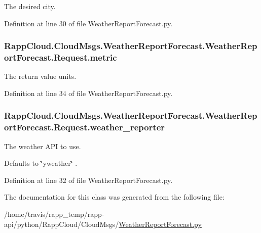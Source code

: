 The desired city. 



Definition at line 30 of file Weather\-Report\-Forecast.\-py.

\hypertarget{classRappCloud_1_1CloudMsgs_1_1WeatherReportForecast_1_1WeatherReportForecast_1_1Request_a2d4f2b9136975273b833f7306203cea7}{
\subsubsection[{metric}]{\setlength{\rightskip}{0pt plus 5cm}Rapp\-Cloud.\-Cloud\-Msgs.\-Weather\-Report\-Forecast.\-Weather\-Report\-Forecast.\-Request.\-metric}}\label{classRappCloud_1_1CloudMsgs_1_1WeatherReportForecast_1_1WeatherReportForecast_1_1Request_a2d4f2b9136975273b833f7306203cea7}


The return value units. 



Definition at line 34 of file Weather\-Report\-Forecast.\-py.

\hypertarget{classRappCloud_1_1CloudMsgs_1_1WeatherReportForecast_1_1WeatherReportForecast_1_1Request_a2101fc3bd266a689b7e7430fb349afc9}{
\subsubsection[{weather\-\_\-reporter}]{\setlength{\rightskip}{0pt plus 5cm}Rapp\-Cloud.\-Cloud\-Msgs.\-Weather\-Report\-Forecast.\-Weather\-Report\-Forecast.\-Request.\-weather\-\_\-reporter}}\label{classRappCloud_1_1CloudMsgs_1_1WeatherReportForecast_1_1WeatherReportForecast_1_1Request_a2101fc3bd266a689b7e7430fb349afc9}


The weather A\-P\-I to use. 

Defaults to \char`\"{}yweather\char`\"{} . 

Definition at line 32 of file Weather\-Report\-Forecast.\-py.



The documentation for this class was generated from the following file\-:\begin{DoxyCompactItemize}
\item 
/home/travis/rapp\-\_\-temp/rapp-\/api/python/\-Rapp\-Cloud/\-Cloud\-Msgs/\hyperlink{WeatherReportForecast_8py}{Weather\-Report\-Forecast.\-py}\end{DoxyCompactItemize}
